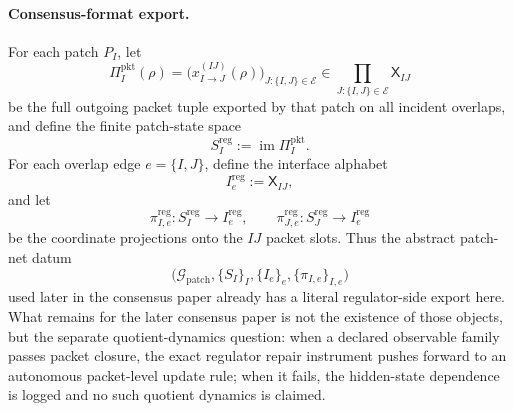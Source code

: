 \documentclass[11pt]{article}
\begin{document}
\paragraph{Consensus-format export.}
For each patch $P_I$, let
\begin{equation}
\Pi_I^{\mathrm{pkt}}(\rho)
=
\bigl(
x_{I\to J}^{(IJ)}(\rho)
\bigr)_{J:\{I,J\}\in\mathcal E}
\in
\prod_{J:\{I,J\}\in\mathcal E}\mathsf X_{IJ}
\end{equation}
be the full outgoing packet tuple exported by that patch on all incident overlaps, and define the
finite patch-state space
\begin{equation}
S_I^{\mathrm{reg}}
:=
\operatorname{im}\Pi_I^{\mathrm{pkt}}.
\end{equation}
For each overlap edge $e=\{I,J\}$, define the interface alphabet
\begin{equation}
I_e^{\mathrm{reg}}:=\mathsf X_{IJ},
\end{equation}
and let
\begin{equation}
\pi_{I,e}^{\mathrm{reg}}:S_I^{\mathrm{reg}}\to I_e^{\mathrm{reg}},
\qquad
\pi_{J,e}^{\mathrm{reg}}:S_J^{\mathrm{reg}}\to I_e^{\mathrm{reg}}
\end{equation}
be the coordinate projections onto the $IJ$ packet slots. Thus the abstract patch-net datum
\[
\bigl(
\mathcal G_{\mathrm{patch}},
\{S_I\}_I,
\{I_e\}_e,
\{\pi_{I,e}\}_{I,e}
\bigr)
\]
used later in the consensus paper already has a literal regulator-side export here. What remains
for the later consensus paper is not the existence of those objects, but the separate quotient-dynamics
question: when a declared observable family passes packet closure, the exact regulator repair
instrument pushes forward to an autonomous packet-level update rule; when it fails, the hidden-state
dependence is logged and no such quotient dynamics is claimed.
\end{document}
